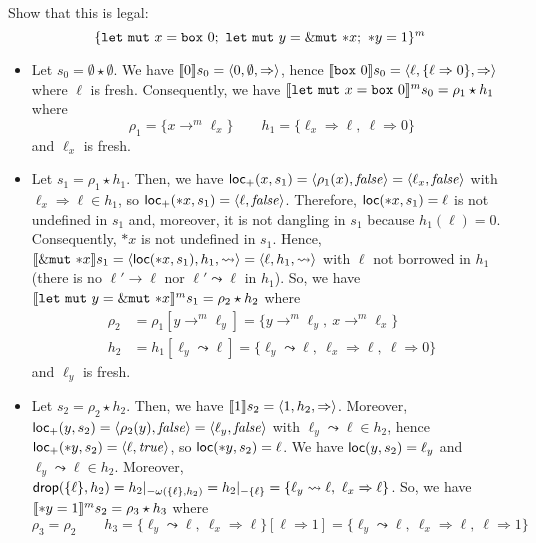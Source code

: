 \begin{example}
  Show that this is legal:
  \[
    \{
      \mathtt{let\ mut}\ x = \mathtt{box}\ 0;\
      \mathtt{let\ mut}\ y = \mutborrow \mathtt{*}x;\
      \mathtt{*}y = 1
    \}^m
  \]
  \begin{itemize}
    \item Let $s_0=\emptyset \star \emptyset$.
    We have $\den[0]{s_0} = \langle 0,\emptyset,\Rightarrow\rangle$, hence
    $\den[\mathtt{box}\ 0]{s_0} =
    \langle\ell,\{\ell\Rightarrow 0\},\Rightarrow\rangle$ where $\ell$ is fresh.
    Consequently, we have
    $\denl[\mathtt{let\ mut}\ x = \mathtt{box}\ 0]{m}{s_0} = \rho_1 \star h_1$
    where
    \[\rho_1=\{x\to^m\ell_x\} \qquad
    h_1 = \{\ell_x\Rightarrow \ell,\ \ell\Rightarrow 0\}\]
    and $\ell_x$ is fresh.
    \item Let $s_1 = \rho_1 \star h_1$.
    Then, we have $\locread(x,s_1)=\langle\rho_1(x),\mathit{false}\rangle=
    \langle\ell_x,\mathit{false}\rangle$ with $\ell_x\Rightarrow \ell\in h_1$,
    so $\locread(*x,s_1)=\langle\ell,\mathit{false}\rangle$. Therefore,
    $\loc(*x,s_1)=\ell$ is not undefined in $s_1$ and, moreover,
    it is not dangling in $s_1$ because $h_1(\ell)=0$. Consequently,
    $*x$ is not undefined in $s_1$. Hence,
    $\den[\mutborrow \mathtt{*}x]{s_1} =
    \langle\loc(*x,s_1),h_1,\leadsto\rangle =
    \langle\ell,h_1,\leadsto\rangle$ with $\ell$ not borrowed in $h_1$
    (there is no $\ell'\to\ell$ nor $\ell'\leadsto\ell$ in $h_1$).
    So, we have
    $\denl[\mathtt{let\ mut}\ y = \mutborrow \mathtt{*}x]{m}{s_1} =
    \rho_2 \star h_2$ where
    \begin{align*}
      \rho_2 & = \rho_1[y\to^m\ell_y] = \{y\to^m\ell_y,\ x\to^m\ell_x\}\\
      h_2 & = h_1[\ell_y\leadsto \ell] =
      \{\ell_y\leadsto \ell,\ \ell_x\Rightarrow \ell,\ \ell\Rightarrow 0\}
    \end{align*}
    and $\ell_y$ is fresh.
    \item Let $s_2 = \rho_2 \star h_2$.
    Then, we have $\den[1]{s_2} = \langle 1,h_2,\Rightarrow\rangle$.
    Moreover, $\locread(y,s_2) = \langle\rho_2(y),\mathit{false}\rangle=
    \langle\ell_y,\mathit{false}\rangle$ with $\ell_y\leadsto \ell \in h_2$,
    hence $\locread(*y,s_2) = \langle\ell,\mathit{true}\rangle$, so
    $\loc(*y,s_2) = \ell$. We have $\loc(y,s_2) = \ell_y$ and
    $\ell_y \leadsto \ell \in h_2$. Moreover,
    $\drop(\{\ell\},h_2) = h_2|_{-{\omega(\{\ell\},h_2)}} = h_2|_{-{\{\ell\}}}
    = \{\ell_y\leadsto \ell,\ \ell_x\Rightarrow \ell\}$.
    So, we have $\denl[\mathtt{*}y = 1]{m}{s_2} = \rho_3 \star h_3$ where
    \[\rho_3 = \rho_2\qquad
    h_3 = \{\ell_y\leadsto \ell,\ \ell_x\Rightarrow \ell\}[\ell\Rightarrow 1]
    = \{\ell_y\leadsto \ell,\ \ell_x\Rightarrow \ell,\ \ell\Rightarrow 1\}\]
  \end{itemize}
\end{example}

